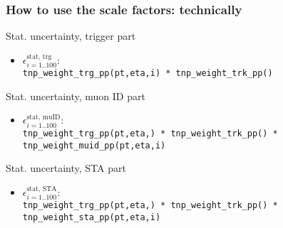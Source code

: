 \documentclass[9pt]{beamer}
\begin{document}
 \begin{frame}[plain]
  \frametitle{How to use the scale factors: technically}
  
  \begin{block}{Stat. uncertainty, trigger part}
  \begin{itemize}
   \item \alert{$\epsilon^\text{stat, trg}_{i=1..100}$}: \\\texttt{tnp\_weight\_trg\_pp(pt,eta,\alert{i}) * tnp\_weight\_trk\_pp()}
   \end{itemize}
  \end{block}
  
  \begin{block}{Stat. uncertainty, muon ID part}
  \begin{itemize}
   \item \alert{$\epsilon^\text{stat, muID}_{i=1..100}$}: \\\texttt{tnp\_weight\_trg\_pp(pt,eta,) * tnp\_weight\_trk\_pp() * tnp\_weight\_\alert{muid}\_pp(pt,eta,\alert{i})}
   \end{itemize}
  \end{block}
  
  \begin{block}{Stat. uncertainty, STA part}
  \begin{itemize}
   \item \alert{$\epsilon^\text{stat, STA}_{i=1..100}$}: \\\texttt{tnp\_weight\_trg\_pp(pt,eta,) * tnp\_weight\_trk\_pp() * tnp\_weight\_\alert{sta}\_pp(pt,eta,\alert{i})}
   \end{itemize}
  \end{block}

 \end{frame}
 
\end{document}
